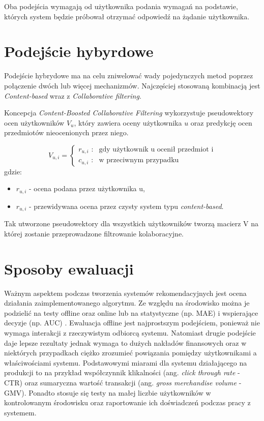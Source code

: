 Oba podejścia wymagają od użytkownika podania wymagań na podstawie, których system będzie próbował otrzymać odpowiedź na żądanie użytkownika.

\section{Podejście hybyrdowe}

Podejście hybrydowe ma na celu zniwelować wady pojedynczych metod poprzez połączenie dwóch lub więcej mechanizmów. Najczęściej stosowaną kombinacją jest \textit{Content-based} wraz z \textit{Collaborative filtering}. 

Koncepcja \textit{Content-Boosted Collaborative Filtering} wykorzystuje pseudowektory ocen użytkowników $V_{u}$, który zawiera oceny użytkownika $u$ oraz predykcję ocen przedmiotów nieocenionych przez niego. 

\begin{equation}
V_{u,i} = \left\{ \begin{array}{ll}
\textrm{$r_{u,i}$ :} & \textrm{gdy użytkownik u ocenił przedmiot i}\\
\textrm{$c_{u,i}$ :} & \textrm{w przeciwnym przypadku}
\end{array} \right.
\end{equation} gdzie:
\begin{itemize}
    \item $r_{u,i}$ - ocena podana przez użytkownika u,
    \item $r_{u,i}$ - przewidywana ocena przez czysty system typu \textit{content-based}. 
\end{itemize}
Tak utworzone pseudowektory dla wszystkich użytkowników tworzą macierz V na której zostanie przeprowadzone filtrowanie kolaboracyjne.

\section{Sposoby ewaluacji}\label{metryki}

Ważnym aspektem podczas tworzenia systemów rekomendacyjnych jest ocena działania zaimplementowanego algorytmu. Ze względu na środowisko można je podzielić na testy offline oraz online lub na statystyczne (np. MAE) i wspierające decyzje (np. AUC) \cite{herlocker}. Ewaluacja offline jest najprostszym podejściem, ponieważ nie wymaga interakcji z rzeczywistym odbiorcą systemu. Natomiast drugie podejście daje lepsze rezultaty jednak wymaga to dużych nakładów finansowych oraz w niektórych przypadkach ciężko zrozumieć powiązania pomiędzy użytkownikami a właściwościami systemu. Podstawowymi miarami dla systemu działającego na produkcji to na przykład współczynnik klikalności (ang. \textit{click through rate} - CTR) oraz sumaryczna wartość transakcji (ang. \textit{gross merchandise volume} - GMV). Ponadto stosuje się testy na małej liczbie użytkowników w kontrolowanym środowisku oraz raportowanie ich doświadczeń podczas pracy z systemem.

